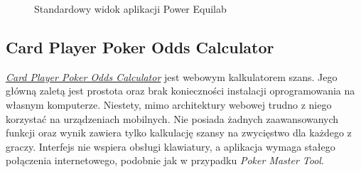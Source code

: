 \begin{figure}[!htbp]
    \caption{Standardowy widok aplikacji Power Equilab}
    \label{fig:power-equilab-view}    
\end{figure}

\subsection{Card Player Poker Odds Calculator}

\href{https://www.cardplayer.com/poker-tools/odds-calculator/texas-holdem/}{\emph{Card Player Poker Odds Calculator}} jest webowym kalkulatorem szans. Jego główną zaletą jest prostota oraz brak konieczności instalacji oprogramowania na własnym komputerze. Niestety, mimo architektury webowej trudno z niego korzystać na urządzeniach mobilnych. Nie posiada żadnych zaawansowanych funkcji oraz wynik zawiera tylko kalkulację szansy na zwycięstwo dla każdego z graczy. Interfejs nie wspiera obsługi klawiatury, a aplikacja wymaga stałego połączenia internetowego, podobnie jak w przypadku \emph{Poker Master Tool}.

